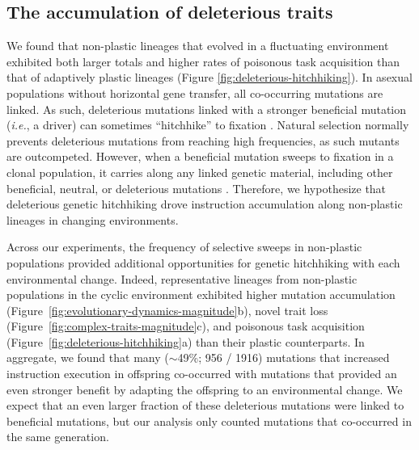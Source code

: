 \subsection{The accumulation of deleterious traits}

We found that non-plastic lineages that evolved in a fluctuating environment exhibited both larger totals and higher rates of poisonous task acquisition than that of adaptively plastic lineages (Figure \ref{fig:deleterious-hitchhiking}).
In asexual populations without horizontal gene transfer, all co-occurring mutations are linked.
As such, deleterious mutations linked with a stronger beneficial mutation (\textit{i.e.}, a driver) can sometimes ``hitchhike'' to fixation \citep{smith_hitch-hiking_1974,van_den_bergh_experimental_2018,buskirk_hitchhiking_2017}.
Natural selection normally prevents deleterious mutations from reaching high frequencies, as such mutants are outcompeted.
However, when a beneficial mutation sweeps to fixation in a clonal population, it carries along any linked genetic material, including other beneficial, neutral, or deleterious mutations \cite{barton_genetic_2000, smith_hitch-hiking_1974}.
Therefore, we hypothesize that deleterious genetic hitchhiking drove  instruction accumulation along non-plastic lineages in changing environments.

Across our experiments, the frequency of selective sweeps in non-plastic populations provided additional opportunities for genetic hitchhiking with each environmental change. 
Indeed, representative lineages from non-plastic populations in the cyclic environment exhibited higher mutation accumulation (Figure~\ref{fig:evolutionary-dynamics-magnitude}b), novel trait loss (Figure~\ref{fig:complex-traits-magnitude}c), and poisonous task acquisition (Figure~\ref{fig:deleterious-hitchhiking}a) than their plastic counterparts.
In aggregate, we found that many ($\sim$49\%; 956 / 1916) mutations that increased  instruction execution in offspring co-occurred with mutations that provided an even stronger benefit by adapting the offspring to an environmental change.
We expect that an even larger fraction of these deleterious mutations were linked to beneficial mutations, but our analysis only counted mutations that co-occurred in the same generation.


